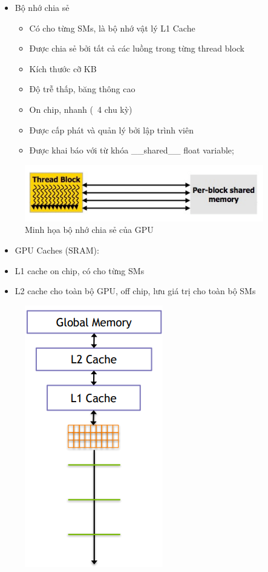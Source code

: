 \documentclass[14pt, a4paper]{article}
\numberwithin{equation}{section}
\numberwithin{figure}{section}
\numberwithin{dl}{section}
\numberwithin{md}{section}
\numberwithin{bd}{section}
\numberwithin{dn}{section}
\numberwithin{hq}{section}
\begin{document}
\begin{itemize}
    \item Bộ nhớ chia sẻ
    \begin{itemize}
        \item Có cho từng SMs, là bộ nhớ vật lý L1 Cache
        \item Được chia sẻ bởi tất cả các luồng trong từng thread block
        \item Kích thước cỡ KB
        \item Độ trễ thấp, băng thông cao
        \item On chip, nhanh (~4 chu kỳ)
        \item Được cấp phát và quản lý bởi lập trình viên
        \item Được khai báo với từ khóa \_\_shared\_\_ float variable;
    \end{itemize}
\end{itemize}

\begin{figure}[H]
    \centering
    \includegraphics[width=0.8\linewidth]{figures/CUDA/GPU_Shared_Memory.png}
    \caption{Minh họa bộ nhớ chia sẻ của GPU}
\end{figure}

\begin{itemize}
    \item GPU Caches (SRAM):
    \item L1 cache on chip, có cho từng SMs 
    \item L2 cache cho toàn bộ GPU, off chip, lưu giá trị cho toàn bộ SMs
\end{itemize}

\begin{figure}[H]
    \centering
    \includegraphics[width=0.2\linewidth]{figures/CUDA/GPU_Caches_Memory.png}
\end{figure}
\end{document}
